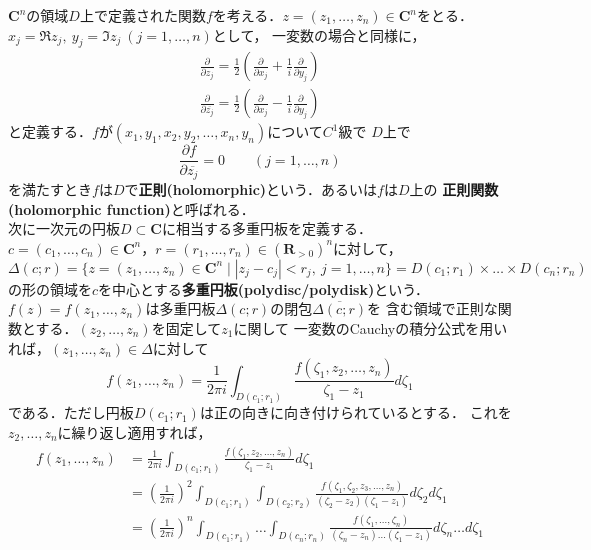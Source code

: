 
$\mathbf{C}^{n}$の領域$D$上で定義された関数$f$を考える．$z = (z_{1},\dots,z_{n}) \in \mathbf{C}^{n}$をとる．\\
$x_{j} = \Re z_{j},\ y_{j} = \Im z_{j}\ (j = 1,\dots ,n)$として，
一変数の場合と同様に，
\begin{align}
  \frac{\partial}{\partial z_{j}} =\frac{1}{2}\left( \frac{\partial}{\partial x_{j}} + \frac{1}{i}\frac{\partial}{\partial y_{j}} \right)\\
  \frac{\partial}{\partial \overline{z_{j}}} =\frac{1}{2}\left( \frac{\partial}{\partial x_{j}} - \frac{1}{i}\frac{\partial}{\partial y_{j}}\right)
\end{align}
と定義する．$f$が$(x_{1},y_{1},x_{2},y_{2},\dots,x_{n},y_{n})$について$C^{1}$級で
$D$上で
\begin{equation}
  \frac{\partial f}{\partial \overline{z_{j}}} = 0 \qquad (j = 1,\dots,n)
\end{equation}
を満たすとき$f$は$D$で\textbf{正則(holomorphic)}という．あるいは$f$は$D$上の
\textbf{正則関数(holomorphic function)}と呼ばれる．\\
次に一次元の円板$D\subset \mathbf{C}$に相当する多重円板を定義する．\\
$c = (c_{1},\dots,c_{n}) \in \mathbf{C}^{n}$，$r= (r_{1},\dots,r_{n}) \in (\mathbf{R}_{>0})^{n}$に対して，
\begin{equation}
  \Delta(c;r) = \{z = (z_{1},\dots,z_{n}) \in \mathbf{C}^{n} \mid |z_{j} - c_{j}| < r_{j},\ j = 1,\dots ,n\} = D(c_{1};r_{1})\times \dots \times D(c_{n};r_{n})
\end{equation}
の形の領域を$c$を中心とする\textbf{多重円板(polydisc/polydisk)}という．\\
$f(z) = f(z_{1},\dots ,z_{n})$は多重円板$\Delta(c;r)$の閉包$\overline{\Delta(c;r)}$を
含む領域で正則な関数とする．$(z_{2},\dots,z_{n})$を固定して$z_{1}$に関して
一変数のCauchyの積分公式を用いれば，$(z_{1},\dots,z_{n}) \in \Delta$に対して
\begin{equation}
  f(z_{1},\dots,z_{n}) = \frac{1}{2\pi i}\int_{D(c_{1};r_{1})}\frac{f(\zeta_{1},z_{2},\dots,z_{n})}{\zeta_{1} - z_{1}}d\zeta_{1}
\end{equation}
である．ただし円板$D(c_{1};r_{1})$は正の向きに向き付けられているとする．
これを$z_{2},\dots,z_{n}$に繰り返し適用すれば，
\begin{align*}
  f(z_{1},\dots,z_{n}) 
  &= \frac{1}{2\pi i}\int_{D(c_{1};r_{1})}\frac{f(\zeta_{1},z_{2},\dots,z_{n})}{\zeta_{1} - z_{1}}d\zeta_{1}\\
  &= \left(\frac{1}{2\pi i}\right)^{2}\int_{D(c_{1};r_{1})}\int_{D(c_{2};r_{2})}\frac{f(\zeta_{1},\zeta_{2},z_{3},\dots,z_{n})}{(\zeta_{2} - z_{2})(\zeta_{1} - z_{1})}d\zeta_{2}d\zeta_{1}\\
  &= \left(\frac{1}{2\pi i}\right)^{n}\int_{D(c_{1};r_{1})}\dots \int_{D(c_{n};r_{n})}\frac{f(\zeta_{1},\dots,\zeta_{n})}{(\zeta_{n} - z_{n})\dots (\zeta_{1} - z_{1})}d\zeta_{n} \dots d\zeta_{1}\\
\end{align*}
